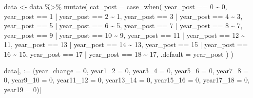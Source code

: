 \documentclass[
  letterpaper,
  DIV=11,
  numbers=noendperiod]{scrartcl}
\newenvironment{Shaded}{\begin{snugshade}}{\end{snugshade}}
\newcommand{\AttributeTok}[1]{\textcolor[rgb]{0.40,0.45,0.13}{#1}}
\newcommand{\DecValTok}[1]{\textcolor[rgb]{0.68,0.00,0.00}{#1}}
\newcommand{\FunctionTok}[1]{\textcolor[rgb]{0.28,0.35,0.67}{#1}}
\newcommand{\NormalTok}[1]{\textcolor[rgb]{0.00,0.23,0.31}{#1}}
\newcommand{\OtherTok}[1]{\textcolor[rgb]{0.00,0.23,0.31}{#1}}
\newcommand{\SpecialCharTok}[1]{\textcolor[rgb]{0.37,0.37,0.37}{#1}}
\newcommand{\StringTok}[1]{\textcolor[rgb]{0.13,0.47,0.30}{#1}}
\begin{document}
\begin{Shaded}
\begin{Highlighting}[]
\NormalTok{data }\OtherTok{\textless{}{-}}\NormalTok{ data }\SpecialCharTok{\%\textgreater{}\%} 
  \FunctionTok{mutate}\NormalTok{(}
    \AttributeTok{cat\_post =} \FunctionTok{case\_when}\NormalTok{(}
\NormalTok{      year\_post }\SpecialCharTok{==} \DecValTok{0} \SpecialCharTok{\textasciitilde{}} \DecValTok{0}\NormalTok{,}
\NormalTok{      year\_post }\SpecialCharTok{==} \DecValTok{1} \SpecialCharTok{|}\NormalTok{ year\_post }\SpecialCharTok{==} \DecValTok{2} \SpecialCharTok{\textasciitilde{}} \DecValTok{1}\NormalTok{,}
\NormalTok{      year\_post }\SpecialCharTok{==} \DecValTok{3} \SpecialCharTok{|}\NormalTok{ year\_post }\SpecialCharTok{==} \DecValTok{4} \SpecialCharTok{\textasciitilde{}} \DecValTok{3}\NormalTok{,}
\NormalTok{      year\_post }\SpecialCharTok{==} \DecValTok{5} \SpecialCharTok{|}\NormalTok{ year\_post }\SpecialCharTok{==} \DecValTok{6} \SpecialCharTok{\textasciitilde{}} \DecValTok{5}\NormalTok{,}
\NormalTok{      year\_post }\SpecialCharTok{==} \DecValTok{7} \SpecialCharTok{|}\NormalTok{ year\_post }\SpecialCharTok{==} \DecValTok{8} \SpecialCharTok{\textasciitilde{}} \DecValTok{7}\NormalTok{,}
\NormalTok{      year\_post }\SpecialCharTok{==} \DecValTok{9} \SpecialCharTok{|}\NormalTok{ year\_post }\SpecialCharTok{==} \DecValTok{10} \SpecialCharTok{\textasciitilde{}} \DecValTok{9}\NormalTok{,}
\NormalTok{      year\_post }\SpecialCharTok{==} \DecValTok{11} \SpecialCharTok{|}\NormalTok{ year\_post }\SpecialCharTok{==} \DecValTok{12} \SpecialCharTok{\textasciitilde{}} \DecValTok{11}\NormalTok{,}
\NormalTok{      year\_post }\SpecialCharTok{==} \DecValTok{13} \SpecialCharTok{|}\NormalTok{ year\_post }\SpecialCharTok{==} \DecValTok{14} \SpecialCharTok{\textasciitilde{}} \DecValTok{13}\NormalTok{,}
\NormalTok{      year\_post }\SpecialCharTok{==} \DecValTok{15} \SpecialCharTok{|}\NormalTok{ year\_post }\SpecialCharTok{==} \DecValTok{16} \SpecialCharTok{\textasciitilde{}} \DecValTok{15}\NormalTok{,}
\NormalTok{      year\_post }\SpecialCharTok{==} \DecValTok{17} \SpecialCharTok{|}\NormalTok{ year\_post }\SpecialCharTok{==} \DecValTok{18} \SpecialCharTok{\textasciitilde{}} \DecValTok{17}\NormalTok{,}
      \AttributeTok{.default =}\NormalTok{ year\_post}
\NormalTok{    )}
\NormalTok{  )}

\NormalTok{data[, }\StringTok{\textquotesingle{}:=\textquotesingle{}}\NormalTok{ (}\AttributeTok{year\_change =} \DecValTok{0}\NormalTok{, }\AttributeTok{year1\_2 =} \DecValTok{0}\NormalTok{, }\AttributeTok{year3\_4 =} \DecValTok{0}\NormalTok{, }\AttributeTok{year5\_6 =} \DecValTok{0}\NormalTok{, }\AttributeTok{year7\_8 =} \DecValTok{0}\NormalTok{, }\AttributeTok{year9\_10 =} \DecValTok{0}\NormalTok{, }\AttributeTok{year11\_12 =} \DecValTok{0}\NormalTok{, }\AttributeTok{year13\_14 =} \DecValTok{0}\NormalTok{, }\AttributeTok{year15\_16 =} \DecValTok{0}\NormalTok{, }\AttributeTok{year17\_18 =} \DecValTok{0}\NormalTok{, }\AttributeTok{year19 =} \DecValTok{0}\NormalTok{)]}


\end{Highlighting}
\end{Shaded}
\end{document}
